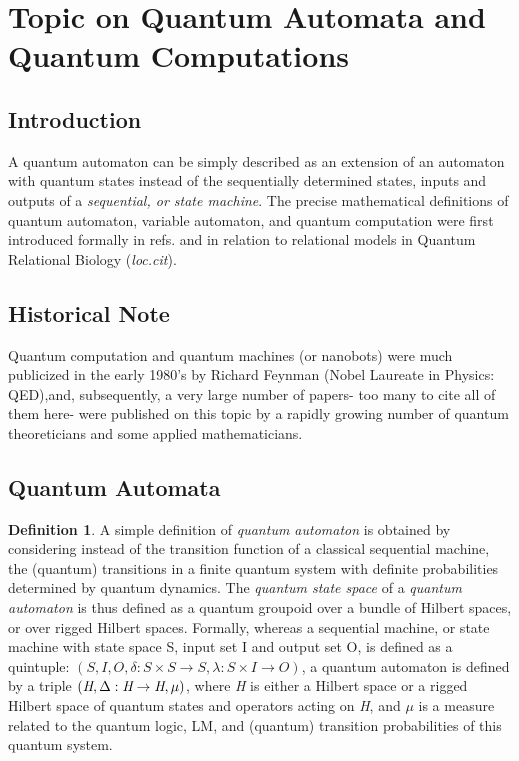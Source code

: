 \documentclass[12pt]{article}
\theoremstyle{plain}
\theoremstyle{definition}
\newtheorem{definition}{Definition}[section]
\theoremstyle{plain}
\numberwithin{equation}{section}
\begin{document}
\section{Topic on Quantum Automata and Quantum Computations}

\subsection{Introduction}
 A quantum automaton can be simply described as an extension of an automaton with quantum states instead of the sequentially determined states, inputs and outputs of a \textit{sequential, or state machine}.
The precise mathematical definitions of quantum automaton, variable automaton, and quantum computation were first introduced formally in refs. \cite{ICB71a} and \cite{ICB71b} in relation to relational models in Quantum Relational Biology (\textit{loc.cit}).


\subsection{Historical Note}  

 Quantum computation and quantum machines (or nanobots) were much publicized in the early 1980's by Richard Feynman (Nobel Laureate in Physics: QED),and, subsequently, a very large number of papers- too many to cite all of them here- were published on this topic by a rapidly growing number of quantum theoreticians and some applied mathematicians.

\subsection{Quantum Automata}

\begin{definition} A simple definition of {\em quantum automaton} is obtained by considering instead of the transition function of a classical sequential machine, the (quantum) transitions in a finite quantum system with definite probabilities determined by quantum dynamics. The {\em quantum state space} of a {\em quantum automaton} is thus defined as a quantum groupoid over a bundle of Hilbert spaces, or over rigged Hilbert spaces. Formally, whereas a sequential machine, or state machine with state space S, input set I and output set O, is defined as a quintuple: $(S, I, O, \delta : S  \times  S \rightarrow  S, \lambda: S \times I\rightarrow  O)$, a quantum automaton is defined by a triple $(\emph{H}, \Delta: \emph{H}  \rightarrow \emph{H}, \mu)$, where \emph{H} is either a Hilbert space or a rigged Hilbert space of quantum states and operators acting on \emph{H}, and $\mu$ is a measure related to the quantum logic, LM, and (quantum) transition probabilities of this quantum system. 
\end{definition} 
\end{document}
